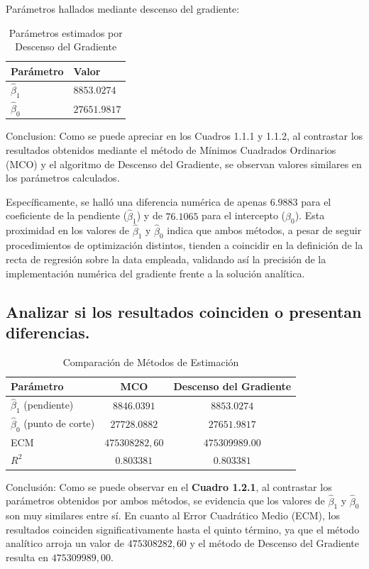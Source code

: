 \documentclass[12pt,a4paper]{article}
\begin{document}
		Parámetros hallados mediante descenso del gradiente:

		\begin{table}[h!]
		\centering
		\begin{tabular}{ll}
		\hline
		\textbf{Parámetro} & \textbf{Valor} \\
		\hline
		$\hat{\beta}_1$ & $8853.0274$ \\
		$\hat{\beta}_0$ & $27651.9817$ \\
		\hline
		\end{tabular}
		\caption{Parámetros estimados por Descenso del Gradiente}
		\end{table}
		Conclusion:
	    Como se puede apreciar en los Cuadros 1.1.1 y 1.1.2, al contrastar los resultados obtenidos mediante el método de Mínimos Cuadrados Ordinarios (MCO) y el algoritmo de Descenso del Gradiente, se observan valores similares en los parámetros calculados. 
		
		Específicamente, se halló una diferencia numérica de apenas $6.9883$ para el coeficiente de la pendiente ($\hat{\beta}_1$) y de $76.1065$ para el intercepto ($\hat{\beta}_0$). Esta proximidad en los valores de $\hat{\beta}_1$ y $\hat{\beta}_0$ indica que ambos métodos, a pesar de seguir procedimientos de optimización distintos, tienden a coincidir en la definición de la recta de regresión sobre la data empleada, validando así la precisión de la implementación numérica del gradiente frente a la solución analítica.

\subsection{Analizar si los resultados coinciden o presentan diferencias.}

	\begin{table}[h!]
	\centering
	\caption{Comparación de Métodos de Estimación}
	\begin{tabular}{lcc}
	\hline
	\textbf{Parámetro} & \textbf{MCO} & \textbf{Descenso del Gradiente} \\
	\hline
	$\hat{\beta}_1$ (pendiente)      & $8846.0391$       & $8853.0274$       \\
	$\hat{\beta}_0$ (punto de corte) & $27728.0882$      & $27651.9817$      \\
	ECM                              & $475308282{,}60$ & $475309989.00$ \\
	$R^2$                            & $0.803381$           & $0.803381$           \\
	\hline
	\end{tabular}
	\end{table}
	Conclusión:
	Como se puede observar en el \textbf{Cuadro 1.2.1}, al contrastar los parámetros obtenidos por ambos métodos, se evidencia que los valores de $\hat{\beta}_1$ y $\hat{\beta}_0$ son muy similares entre sí. En cuanto al Error Cuadrático Medio (ECM), los resultados coinciden significativamente hasta el quinto término, ya que el método analítico arroja un valor de $475308282,60$ y el método de Descenso del Gradiente resulta en $475309989,00$.
	
\end{document}
